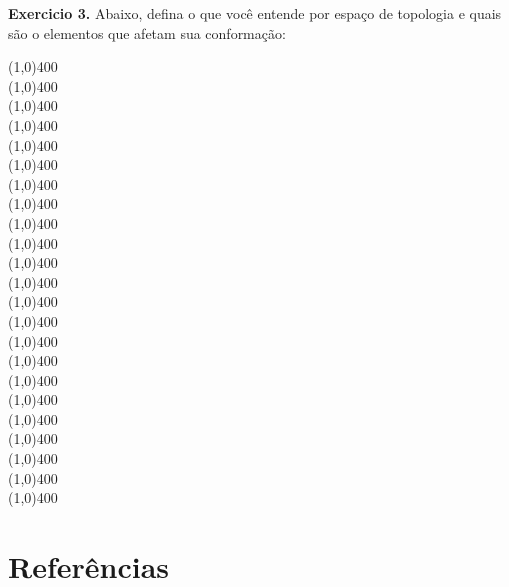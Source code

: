 \begin{refsection}
\begin{blackBlock}{\textbf{Exercicio 3.}}\label{tut3:ex:3.\arabic{ex}}
	Abaixo, defina o que você entende por espaço de topologia e quais são o elementos que afetam sua conformação:
  \begin{center}
  \line(1,0){400}\\
  \line(1,0){400}\\
  \line(1,0){400}\\
  \line(1,0){400}\\
  \line(1,0){400}\\
  \line(1,0){400}\\
  \line(1,0){400}\\
  \line(1,0){400}\\
  \line(1,0){400}\\
  \line(1,0){400}\\
  \line(1,0){400}\\
  \line(1,0){400}\\
  \line(1,0){400}\\
  \line(1,0){400}\\
  \line(1,0){400}\\
  \line(1,0){400}\\
  \line(1,0){400}\\
  \line(1,0){400}\\
  \line(1,0){400}\\
  \line(1,0){400}\\
  \line(1,0){400}\\
  \line(1,0){400}\\
  \line(1,0){400}\\
 
 \end{center}


\end{blackBlock}


\section{Referências}\label{tut3:refs}
\printbibliography[heading=none]
\end{refsection}
%